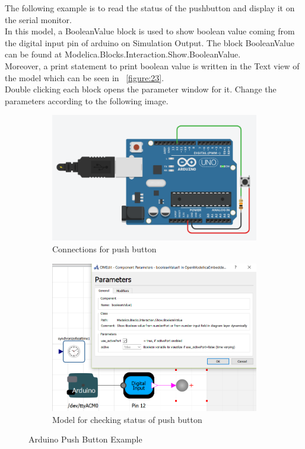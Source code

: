 \documentclass[12pt,a4paper]{report}
\begin{document}
The following example is to read the status of the pushbutton and display it on the serial monitor.\\

In this model, a BooleanValue block is used to show boolean value coming from the digital input pin of arduino on Simulation Output. The block BooleanValue can be found at Modelica.Blocks.Interaction.Show.BooleanValue.\\

Moreover, a print statement to print boolean value is written in the Text view of the model which can be seen in ~\ref{figure:23}.\\

Double clicking each block opens the parameter window for it. Change the parameters according to the following image.

\begin{figure}[H]
\begin{subfigure}{.5\textwidth}
\centering
\includegraphics[width =\linewidth]{2}
\caption{Connections for push button}
\end{subfigure}
\begin{subfigure}{.5\textwidth}
\centering
\includegraphics[width =\linewidth]{pb_ex1}
\caption{Model for checking status of push button}
\end{subfigure}
\caption {Arduino Push Button Example}
\label{figure:15}
\end{figure}
\end{document}
